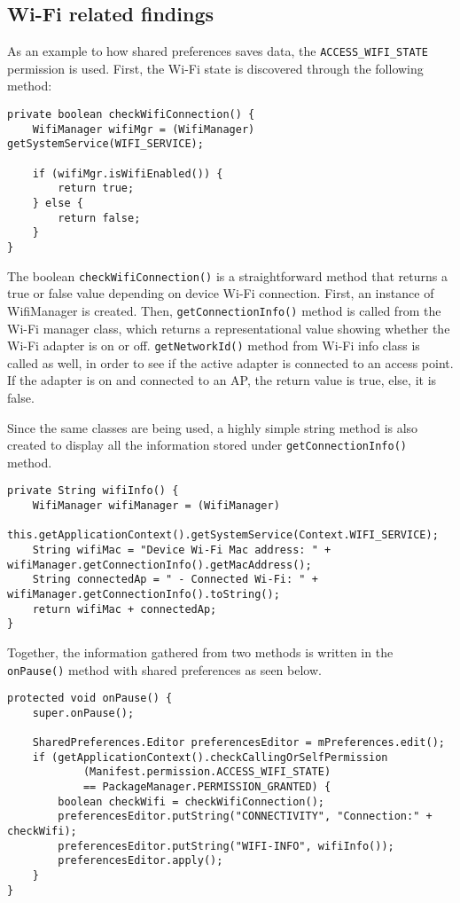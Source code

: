 \documentclass[
  a4paper,  %
  twoside,  %
  bibliography=totoc,
  headsepline,
  cleardoublepage=empty,
  parskip=half,
  draft=false,
  open=any
]{scrbook}
\begin{document}
\subsection{Wi-Fi related findings}
As an example to how shared preferences saves data, the \texttt{ACCESS\_WIFI\_STATE} permission is used. First, the Wi-Fi state is discovered through the following method:
\begin{lstlisting}
private boolean checkWifiConnection() {
	WifiManager wifiMgr = (WifiManager) getSystemService(WIFI_SERVICE);
	
	if (wifiMgr.isWifiEnabled()) { 
		return true;
	} else {
		return false;
	}
}
\end{lstlisting}
The boolean \texttt{checkWifiConnection()} is a straightforward method that returns a true or false value depending on device Wi-Fi connection. First, an instance of WifiManager is created. Then, \texttt{getConnectionInfo()} method is called from the Wi-Fi manager class, which returns a representational value showing whether the Wi-Fi adapter is on or off. \texttt{getNetworkId()} method from Wi-Fi info class is called as well, in order to see if the active adapter is connected to an access point. If the adapter is on and connected to an AP, the return value is true, else, it is false. 

Since the same classes are being used, a highly simple string method is also created to display all the information stored under \texttt{getConnectionInfo()} method.
\begin{lstlisting}
private String wifiInfo() {
	WifiManager wifiManager = (WifiManager)
		this.getApplicationContext().getSystemService(Context.WIFI_SERVICE);
	String wifiMac = "Device Wi-Fi Mac address: " + wifiManager.getConnectionInfo().getMacAddress();
	String connectedAp = " - Connected Wi-Fi: " + wifiManager.getConnectionInfo().toString();
	return wifiMac + connectedAp;
}
\end{lstlisting}

Together, the information gathered from two methods is written in the \texttt{onPause()} method with shared preferences as seen below.
\begin{lstlisting}
protected void onPause() {
	super.onPause();
	
	SharedPreferences.Editor preferencesEditor = mPreferences.edit();
	if (getApplicationContext().checkCallingOrSelfPermission
			(Manifest.permission.ACCESS_WIFI_STATE)
			== PackageManager.PERMISSION_GRANTED) {
		boolean checkWifi = checkWifiConnection();
		preferencesEditor.putString("CONNECTIVITY", "Connection:" + checkWifi);
		preferencesEditor.putString("WIFI-INFO", wifiInfo());
		preferencesEditor.apply();
	}
}
\end{lstlisting}
\end{document}

